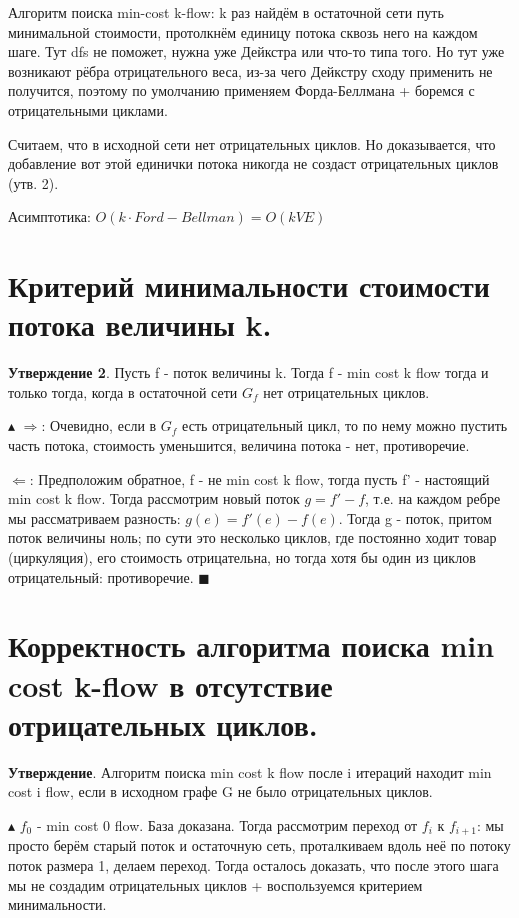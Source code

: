 Алгоритм поиска min-cost k-flow: k раз найдём в остаточной сети путь минимальной стоимости, протолкнём единицу потока сквозь него на каждом шаге. Тут dfs не поможет, нужна уже Дейкстра или что-то типа того. Но тут уже возникают рёбра отрицательного веса, из-за чего Дейкстру сходу применить не получится, поэтому по умолчанию применяем Форда-Беллмана + боремся с отрицательными циклами.

Считаем, что в исходной сети нет отрицательных циклов. Но доказывается, что добавление вот этой единички потока никогда не создаст отрицательных циклов (утв. 2).

Асимптотика: $O(k \cdot Ford-Bellman) = O(k VE)$

\setcounter{section}{88}
\section{Критерий минимальности стоимости потока величины k.}

\textbf{Утверждение 2}. Пусть f - поток величины k. Тогда f - min cost k flow тогда и только тогда, когда в остаточной сети $G_f$ нет отрицательных циклов.

$\blacktriangle$
$\Rightarrow$: Очевидно, если в $G_f$ есть отрицательный цикл, то по нему можно пустить часть потока, стоимость уменьшится, величина потока - нет, противоречие.

$\Leftarrow$:  Предположим обратное, f - не min cost k flow, тогда пусть f' - настоящий min cost k flow. Тогда рассмотрим новый поток $g = f' - f$, т.е. на каждом ребре мы рассматриваем разность: $g(e) = f'(e) - f(e)$. Тогда g - поток, притом поток величины ноль; по сути это несколько циклов, где постоянно ходит товар (циркуляция), его стоимость отрицательна, но тогда хотя бы один из циклов отрицательный: противоречие.
$\blacksquare$

\setcounter{section}{89}
\section{Корректность алгоритма поиска min cost k-flow в отсутствие отрицательных циклов.}

\textbf{Утверждение}. Алгоритм поиска min cost k flow после i итераций находит min cost i flow, если в исходном графе G не было отрицательных циклов. 

$\blacktriangle$
$f_0$ - min cost 0 flow. База доказана.
Тогда рассмотрим переход от $f_i$ к $f_{i+1}$: мы просто берём старый поток и остаточную сеть, проталкиваем вдоль неё по потоку поток размера 1, делаем переход. Тогда осталось доказать, что после этого шага мы не создадим отрицательных циклов + воспользуемся критерием минимальности. 

